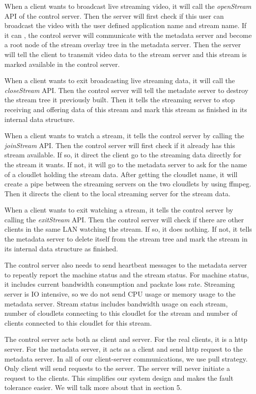 \documentclass[letterpaper,twocolumn,10pt]{article}
\begin{document}
When a client wants to broadcast live streaming video, it will call the \emph{openStream} API of the control server. Then the server will first check if this user can broadcast the video with the user defined application name and stream name. If it can , the control server will communicate with the metadata server and become a root node of the stream overlay tree in the metadata server. Then the server will tell the client to transmit video data to the stream server and this stream is marked available in the control server.

When a client wants to exit broadcasting live streaming data, it will call the \emph{closeStream} API. Then the control server will tell the metadate server to destroy the stream tree it previously built. Then it tells the streaming server to stop receiving and offering data of this stream and mark this stream as finished in its internal data structure.

When a client wants to watch a stream, it tells the control server by calling the \emph{joinStream} API. Then the control server will first check if it already has this stream available. If so, it direct the client go to the streaming data directly for the stream it wants. If not, it will go to the metadata server to ask for the name of a cloudlet holding the stream data. After getting the cloudlet name, it will create a pipe between the streaming servers on the two cloudlets by using ffmpeg. Then it directs the client to the local streaming server for the stream data.

When a client wants to exit watching a stream, it tells the control server by calling the \emph{exitStream} API. Then the control server will check if there are other clients in the same LAN watching the stream. If so, it does nothing. If not, it tells the metadata server to delete itself from the stream tree and mark the stream in its internal data structure as finished.

The control server also needs to send heartbeat messages to the metadata server to repeatly report the machine status and the stream status. For machine status, it includes current bandwidth consumption and packate loss rate. Streaming server is IO intensive, so we do not send CPU usage or memory usage to the metadata server. Stream status includes bandwidth usage on each stream, number of cloudlets connecting to this cloudlet for the stream and number of clients connected to this cloudlet for this stream.

The control server acts both as client and server. For the real clients, it is a http server. For the metadata server, it acts as a client and send http request to the metadata server. In all of our client-server communications, we use pull strategy. Only client will send requests to the server. The server will never initiate a request to the clients. This simplifies our system design and makes the fault tolerance easier. We will talk more about that in section 5.
\end{document}
